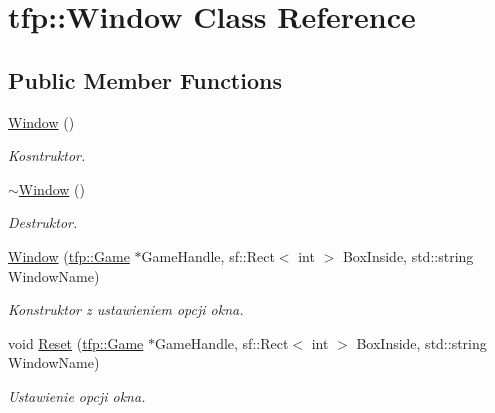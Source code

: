 \hypertarget{classtfp_1_1_window}{}\section{tfp\+:\+:Window Class Reference}
\label{classtfp_1_1_window}
\subsection*{Public Member Functions}
\begin{DoxyCompactItemize}
\item 
\mbox{\label{classtfp_1_1_window_ae124e0ff725122209463e2164decb53c}} 
\mbox{\hyperlink{classtfp_1_1_window_ae124e0ff725122209463e2164decb53c}{Window}} ()
\begin{DoxyCompactList}\small\item\em Kosntruktor. \end{DoxyCompactList}\item 
\mbox{\label{classtfp_1_1_window_ab21e4282b8e018e1968cc06aa0a69570}} 
\mbox{\hyperlink{classtfp_1_1_window_ab21e4282b8e018e1968cc06aa0a69570}{$\sim$\+Window}} ()
\begin{DoxyCompactList}\small\item\em Destruktor. \end{DoxyCompactList}\item 
\mbox{\label{classtfp_1_1_window_ad0ce3fc555423e0be51ee40273fa2547}} 
\mbox{\hyperlink{classtfp_1_1_window_ad0ce3fc555423e0be51ee40273fa2547}{Window}} (\mbox{\hyperlink{classtfp_1_1_game}{tfp\+::\+Game}} $\ast$Game\+Handle, sf\+::\+Rect$<$ int $>$ Box\+Inside, std\+::string Window\+Name)
\begin{DoxyCompactList}\small\item\em Konstruktor z ustawieniem opcji okna. \end{DoxyCompactList}\item 
\mbox{\label{classtfp_1_1_window_a24f9e39a2acf82ca2432e10edbc38067}} 
void \mbox{\hyperlink{classtfp_1_1_window_a24f9e39a2acf82ca2432e10edbc38067}{Reset}} (\mbox{\hyperlink{classtfp_1_1_game}{tfp\+::\+Game}} $\ast$Game\+Handle, sf\+::\+Rect$<$ int $>$ Box\+Inside, std\+::string Window\+Name)
\begin{DoxyCompactList}\small\item\em Ustawienie opcji okna. \end{DoxyCompactList}\item 

\end{DoxyCompactItemize}
